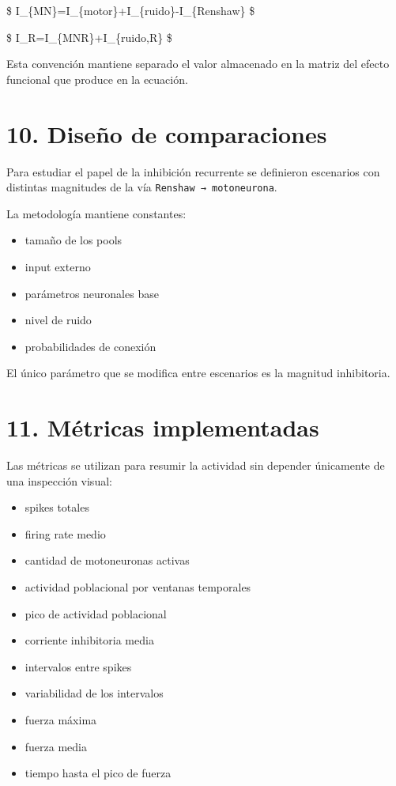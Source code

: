 \documentclass[11pt,a4paper]{article}
\providecommand{\tightlist}{%
  \setlength{\itemsep}{0pt}\setlength{\parskip}{0pt}}
\begin{document}
\$ I\_\{MN\}=I\_\{motor\}+I\_\{ruido\}-I\_\{Renshaw\} \$

\$ I\_R=I\_\{MN\rightarrow R\}+I\_\{ruido,R\} \$

Esta convención mantiene separado el valor almacenado en la matriz del
efecto funcional que produce en la ecuación.

\hypertarget{diseuxf1o-de-comparaciones}{%
\section{10. Diseño de comparaciones}\label{diseuxf1o-de-comparaciones}}

Para estudiar el papel de la inhibición recurrente se definieron
escenarios con distintas magnitudes de la vía
\texttt{Renshaw\ →\ motoneurona}.

La metodología mantiene constantes:

\begin{itemize}
\tightlist
\item
  tamaño de los pools
\item
  input externo
\item
  parámetros neuronales base
\item
  nivel de ruido
\item
  probabilidades de conexión
\end{itemize}

El único parámetro que se modifica entre escenarios es la magnitud
inhibitoria.

\hypertarget{muxe9tricas-implementadas}{%
\section{11. Métricas implementadas}\label{muxe9tricas-implementadas}}

Las métricas se utilizan para resumir la actividad sin depender
únicamente de una inspección visual:

\begin{itemize}
\tightlist
\item
  spikes totales
\item
  firing rate medio
\item
  cantidad de motoneuronas activas
\item
  actividad poblacional por ventanas temporales
\item
  pico de actividad poblacional
\item
  corriente inhibitoria media
\item
  intervalos entre spikes
\item
  variabilidad de los intervalos
\item
  fuerza máxima
\item
  fuerza media
\item
  tiempo hasta el pico de fuerza
\end{itemize}
\end{document}
